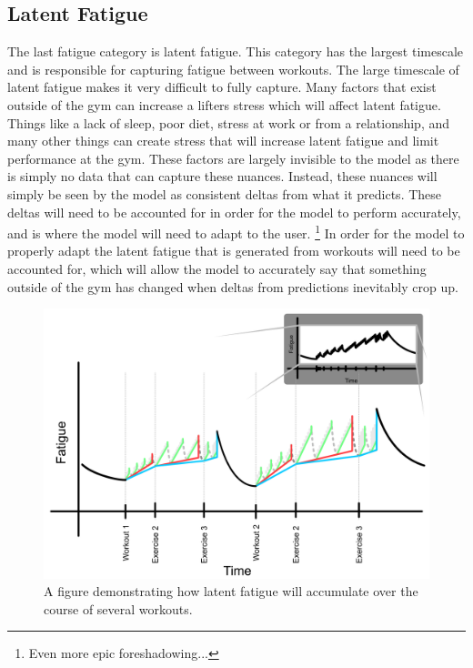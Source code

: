\subsection{Latent Fatigue}
\label{sec:P2C1_LatentFatigue}

The last fatigue category is latent fatigue. This category has the largest timescale and is responsible for capturing fatigue between workouts. The large timescale of latent fatigue makes it very difficult to fully capture. Many factors that exist outside of the gym can increase a lifters stress which will affect latent fatigue. Things like a lack of sleep, poor diet, stress at work or from a relationship, and many other things can create stress that will increase latent fatigue and limit performance at the gym. These factors are largely invisible to the model as there is simply no data that can capture these nuances. Instead, these nuances will simply be seen by the model as consistent deltas from what it predicts. These deltas will need to be accounted for in order for the model to perform accurately, and is where the model will need to adapt to the user. \footnote{Even more epic foreshadowing...} In order for the model to properly adapt the latent fatigue that is generated from workouts will need to be accounted for, which will allow the model to accurately say that something outside of the gym has changed when deltas from predictions inevitably crop up.

\begin{figure}[htb]
    \centering
    \includegraphics[scale=0.55]{images/p2/ch1/LatentFatigue.png}
    \caption{A figure demonstrating how latent fatigue will accumulate over the course of several workouts.}
    \label{fig:P2C1_LatentFatigue}
\end{figure}


